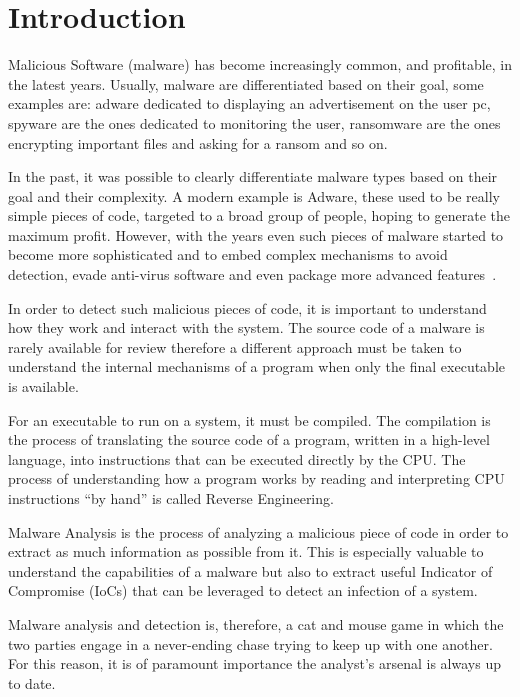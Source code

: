 \chapter{Introduction}

Malicious Software (malware) has become increasingly common, and profitable, in the latest years. Usually, malware are differentiated based on their goal, some examples are: adware dedicated to displaying an advertisement on the user pc, spyware are the ones dedicated to monitoring the user, ransomware are the ones encrypting important files and asking for a ransom and so on. 

In the past, it was possible to clearly differentiate malware types based on their goal and their complexity. A modern example is Adware, these used to be really simple pieces of code, targeted to a broad group of people, hoping to generate the maximum profit. However, with the years even such pieces of malware started to become more sophisticated and to embed complex mechanisms to avoid detection, evade anti-virus software and even package more advanced features~\cite{bitdef}.

In order to detect such malicious pieces of code, it is important to understand how they work and interact with the system. The source code of a malware is rarely available for review therefore a different approach must be taken to understand the internal mechanisms of a program when only the final executable is available. 

For an executable to run on a system, it must be compiled. The compilation is the process of translating the source code of a program, written in a high-level language, into instructions that can be executed directly by the CPU. The process of understanding how a program works by reading and interpreting CPU instructions ``by hand'' is called Reverse Engineering.

Malware Analysis is the process of analyzing a malicious piece of code in order to extract as much information as possible from it. This is especially valuable to understand the capabilities of a malware but also to extract useful Indicator of Compromise (IoCs) that can be leveraged to detect an infection of a system. 

Malware analysis and detection is, therefore, a cat and mouse game in which the two parties engage in a never-ending chase trying to keep up with one another. For this reason, it is of paramount importance the analyst's arsenal is always up to date.


